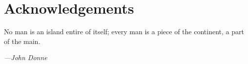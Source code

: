 \documentclass[class=report,11pt,crop=false]{standalone}
\begin{document}
\chapter*{Acknowledgements}
\epigraph{No man is an island entire of itself; every man is a piece of the continent, a part of the main.}%
    {\emph{---John Donne}}
\vspace{0.3cm}

\lipsum[1]



\end{document}
